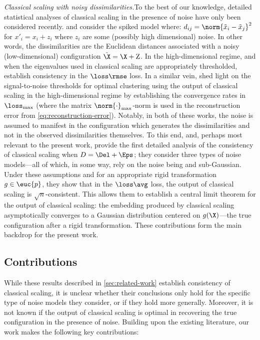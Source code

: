 \documentclass[10pt]{article}
\begin{document}
\textit{Classical scaling with noisy dissimilarities.}\quad To the best of our knowledge, detailed statistical analyses of classical scaling in the presence of noise have only been considered recently. \cite{peterfreund2021multidimensional} and \cite{little2023analysis} consider the spiked model where: $d_{ij} = \norm{\tilde{x}_i - \tilde{x}_j}^2$ for ${x}'_i = x_i + z_i$ where $z_i$ are some (possibly high dimensional) noise. In other words, { the dissimilarities are the Euclidean distances associated with a noisy (low-dimensional) configuration} $\tilde{\X} = \X + \mathrm{Z}$. 
In the high-dimensional regime, and when the eigenvalues used in classical scaling are appropriately thresholded, \cite{peterfreund2021multidimensional} establish consistency in the $\loss\rmse$ loss. In a similar vein, \cite{little2023analysis} shed light on the signal-to-noise thresholds for optimal clustering using the output of classical scaling in the high-dimensional regime by establishing the convergence rates in $\loss_{\max}$ ({{where the matrix $\norm{\cdot}_{\max}$-norm is used in the reconstruction error from \cref{eq:reconstruction-error}}}). Notably, in both of these works, the noise is assumed to manifest in the configuration which generates the dissimilarities and not in the observed dissimilarities themselves. To this end, and, perhaps most relevant to the present work, \cite{li2020central} provide the first detailed analysis of the consistency of classical scaling when $D = \Del + \Eps$; they consider three types of noise models---all of which, in some way, rely on the noise being \iid{} and sub-Gaussian. Under these assumptions and for an appropriate rigid transformation $g \in \euc{p}$, they show that in the $\loss\avg$ loss, the output of classical scaling is $\sqrt{n}$-consistent. This allows them to establish a central limit theorem for the output of classical scaling: the embedding produced by classical scaling asymptotically converges to a Gaussian distribution centered on $g(\X)$---the true configuration after a rigid transformation. These contributions form the main backdrop for the present work. 

\subsection{Contributions}
\label{sec:contributions}

While these results described in \cref{sec:related-work} establish consistency of classical scaling, it is unclear whether their conclusions only hold for the specific type of noise models they consider, or if they hold more generally. Moreover, it is not known if the output of classical scaling is optimal in recovering the true configuration in the presence of noise. Building upon the existing literature, our work makes the following key contributions:
\end{document}
